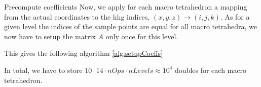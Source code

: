 \documentclass[a4paper,11pt,reqno]{amsart}
\numberwithin{figure}{section}
\numberwithin{table}{section}
\begin{document}
\begin{section}{Precompute coefficients}
Now, we apply for each macro tetrahedron
a mapping from the actual coordinates to the hhg indices, $(x,y,z) \rightarrow (i,j,k)$.
As for a given level the indices of the sample points are equal for all macro tetrahedra,
we now have to setup the matrix $A$ only once for this level. 

This gives the following algorithm \ref{alg:setupCoeffs} 
\newline
\begin{algorithm}[H]

 \caption{Precompute and store coefficients of quadratic polynomial}
 \label{alg:setupCoeffs}
\end{algorithm}

In total, we have to store $10\cdot14\cdot nOps\cdot nLevels \approx 10^4$ doubles
for each macro tetrahedron.





\end{section}










\clearpage
\end{document}
